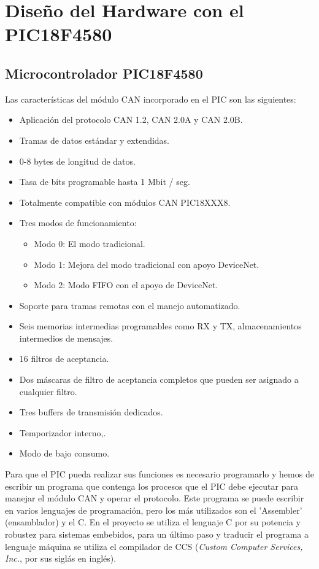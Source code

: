 \section{Diseño del Hardware con el PIC18F4580}
\subsection{Microcontrolador PIC18F4580}

Las características del módulo CAN incorporado en el PIC son las siguientes:
\begin{itemize}
	\item Aplicación del protocolo CAN 1.2,
	CAN 2.0A y CAN 2.0B.
	\item Tramas de datos estándar y extendidas.
	\item 0-8 bytes de longitud de datos.
	\item Tasa de bits programable hasta 1 Mbit / seg.
	\item Totalmente compatible con módulos CAN PIC18XXX8.
	\item Tres modos de funcionamiento:
	\begin{itemize}
		\item Modo 0: El modo tradicional.
		\item Modo 1: Mejora del modo tradicional con
		apoyo DeviceNet.
		\item Modo 2: Modo FIFO con el apoyo de DeviceNet.
		\end {itemize}
		\item Soporte para tramas remotas con el manejo automatizado.
		\item  Seis memorias intermedias programables como RX y TX, 
		almacenamientos intermedios de mensajes.
		\item 16 filtros de aceptancia.
		\item Dos máscaras de filtro de aceptancia completos que pueden ser asignado a cualquier filtro.
		\item Tres buffers de transmisión dedicados.
		\item Temporizador interno,\cite{DaP}.
		\item Modo de bajo consumo.
	\end{itemize}

Para que el PIC pueda realizar sus funciones es necesario programarlo y hemos de escribir un programa que contenga los procesos que el PIC debe ejecutar para manejar el módulo CAN y operar el protocolo. Este programa se puede escribir en varios lenguajes de programación, pero los  más utilizados son el ’Assembler’ (ensamblador) y el C. En el proyecto se utiliza el lenguaje C por su potencia y robustez para sistemas embebidos, para un último paso y traducir el programa a lenguaje máquina se utiliza el compilador  de CCS (\textit{Custom Computer Services, Inc.}, por sus siglás en inglés).

